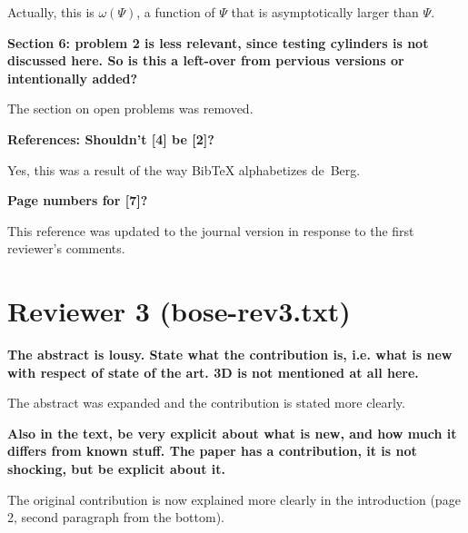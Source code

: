 \documentclass[lotsofwhite]{patmorin}
\newenvironment{comment}{\noindent\bf}{}
\newenvironment{response}{\noindent}{}
\begin{document}
\begin{response}
Actually, this is $\omega(\Psi)$, a function of $\Psi$ that is
asymptotically larger than $\Psi$.
\end{response}


\begin{comment}
Section 6: problem 2 is less relevant, since testing cylinders is not
discussed here. So is this a left-over from pervious versions or
intentionally added?
\end{comment}

\begin{response}
The section on open problems was removed.
\end{response}



\begin{comment}
References: Shouldn't [4] be [2]?
\end{comment}

\begin{response}
Yes, this was a result of the way BibTeX alphabetizes de~Berg.
\end{response}

\begin{comment}
Page numbers for [7]?
\end{comment}

\begin{response}
This reference was updated to the journal version in response to the
first reviewer's comments.
\end{response}


\section*{Reviewer 3 (bose-rev3.txt)}

\begin{comment}
The abstract is lousy. State what the contribution is, i.e. what is 
new with respect of state of the art. 3D is not mentioned at all here.
\end{comment}

\begin{response}
The abstract was expanded and the contribution is stated more clearly.
\end{response}

\begin{comment}
Also in the text, be very explicit about what is new, and how much it 
differs from known stuff. The paper has a contribution, it is not
shocking, but be explicit about it.
\end{comment}

\begin{response}
The original contribution is now explained more clearly in the
introduction (page 2, second paragraph from the bottom).
\end{response}
\end{document}
